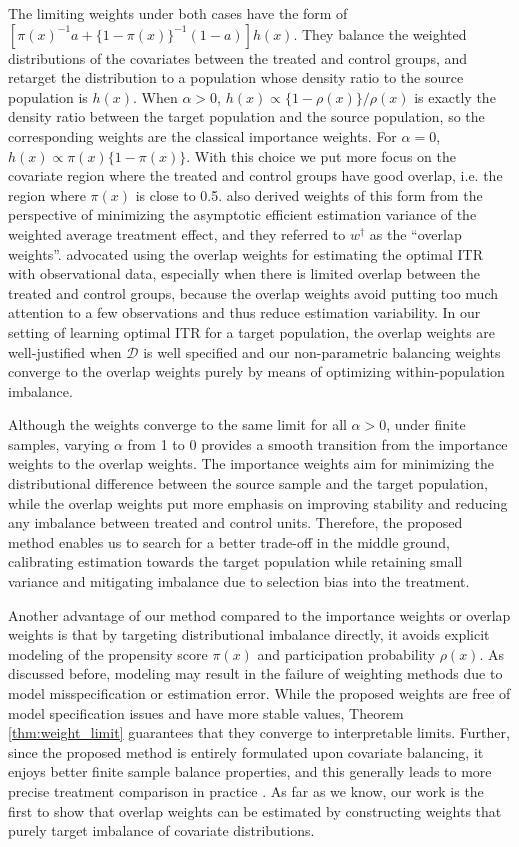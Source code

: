 \documentclass[12pt]{article}
\begin{document}
The limiting weights under both cases have the form of 
$[ {\pi(x)}^{-1} a +  \{ 1-\pi(x) \}^{-1}(1-a) ] h(x).$
They balance the weighted distributions of the covariates between the treated and control groups, and retarget the distribution to a population whose density ratio to the source population is $h(x)$. When $\alpha > 0$, $h(x) \propto \{ 1 - \rho(x) \}/\rho(x)$ is exactly the density ratio between the target population and the source population, so the corresponding weights are the classical importance weights.
For $\alpha = 0$, $h(x) \propto \pi(x) \{ 1 - \pi(x) \}$. With this choice we put more focus on the covariate region where the treated and control groups have good overlap, i.e. the region where $\pi(x)$ is close to 0.5. \citet{li2018balancing} also derived weights of this form from the perspective of minimizing the asymptotic efficient estimation variance of the weighted average treatment effect, and they referred to $w^\dagger$ as the ``overlap weights''. \citet{kallus2020more} advocated using the overlap weights for estimating the optimal ITR with observational data, especially when there is limited overlap between the treated and control groups, because the overlap weights avoid putting too much attention to a few observations and thus reduce estimation variability. In our setting of learning optimal ITR for a target population, the overlap weights are well-justified when $\mathcal{D}$ is well specified and our non-parametric balancing weights converge to the overlap weights purely by means of optimizing within-population imbalance. 

Although the weights converge to the same limit for all $\alpha > 0$, under finite samples, varying $\alpha$ from 1 to 0 provides a smooth transition from the importance weights to the overlap weights. The importance weights aim for minimizing the distributional difference between the source sample and the target population, while the overlap weights put more emphasis on improving stability and reducing any imbalance between treated and control units. Therefore, the proposed method enables us to search for a better trade-off in the middle ground, calibrating estimation towards the target population while retaining small variance and mitigating imbalance due to selection bias into the treatment.

Another advantage of our method compared to the importance weights or overlap weights is that by targeting distributional imbalance directly,  it avoids explicit modeling of the propensity score $\pi(x)$ and participation probability $\rho(x)$. As discussed before, modeling may result in the failure of weighting methods due to model misspecification or estimation error. While the proposed weights are free of model specification issues and have more stable values, Theorem \ref{thm:weight_limit} guarantees that they converge to interpretable limits. Further, since the proposed method is entirely formulated upon covariate balancing, it enjoys better finite sample balance properties, and this generally leads to more precise treatment comparison in practice \citep{chattopadhyay2020balancing}. As far as we know, our work is the first to show that overlap weights can be estimated by constructing weights that purely target imbalance of covariate distributions.
\end{document}
